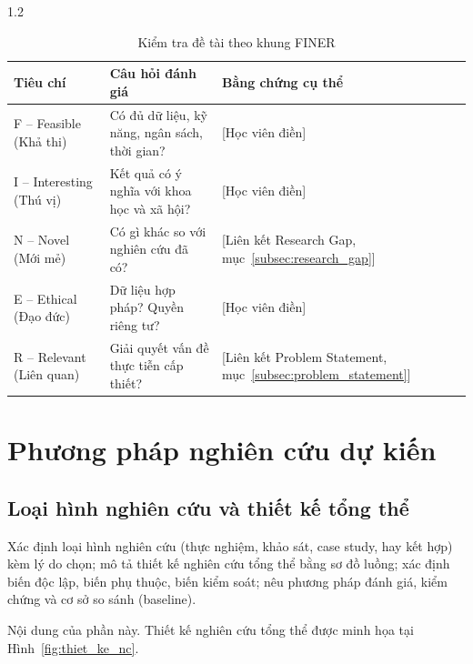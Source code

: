 \begin{spacing}{1.2}
\begin{table}[htpb]
\centering
\caption{Kiểm tra đề tài theo khung FINER}
\label{tab:finer}
\renewcommand{\arraystretch}{1.3}
{\fontsize{12}{14}\selectfont
\begin{tabularx}{\textwidth}{|>{\raggedright\arraybackslash}p{3.4cm}|>{\raggedright\arraybackslash}p{5.2cm}|X|}
\hline
\textbf{Tiêu chí} & \textbf{Câu hỏi đánh giá} & \textbf{Bằng chứng cụ thể} \\
\hline
F -- Feasible (Khả thi) & Có đủ dữ liệu, kỹ năng, ngân sách, thời gian? & [Học viên điền] \\
\hline
I -- Interesting (Thú vị) & Kết quả có ý nghĩa với khoa học và xã hội? & [Học viên điền] \\
\hline
N -- Novel (Mới mẻ) & Có gì khác so với nghiên cứu đã có? & [Liên kết Research Gap, mục~\ref{subsec:research_gap}] \\
\hline
E -- Ethical (Đạo đức) & Dữ liệu hợp pháp? Quyền riêng tư? & [Học viên điền] \\
\hline
R -- Relevant (Liên quan) & Giải quyết vấn đề thực tiễn cấp thiết? & [Liên kết Problem Statement, mục~\ref{subsec:problem_statement}] \\
\hline
\end{tabularx}
}
\end{table}

\section{Phương pháp nghiên cứu dự kiến}
\label{sec:phuong_phap_nc}

\subsection{Loại hình nghiên cứu và thiết kế tổng thể}
\label{subsec:thiet_ke}

\begin{huongdan}
Xác định loại hình nghiên cứu (thực nghiệm, khảo sát, case study, hay kết hợp) kèm lý do chọn; mô tả thiết kế nghiên cứu tổng thể bằng sơ đồ luồng; xác định biến độc lập, biến phụ thuộc, biến kiểm soát; nêu phương pháp đánh giá, kiểm chứng và cơ sở so sánh (baseline).
\end{huongdan}

Nội dung của phần này. Thiết kế nghiên cứu tổng thể được minh họa tại Hình~\ref{fig:thiet_ke_nc}.


\end{spacing}
